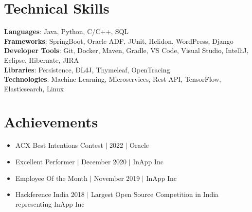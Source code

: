 \documentclass[letterpaper,11pt]{article}
\newcommand{\resumeItem}[1]{
  \item\small{
    {#1 \vspace{-2pt}}
  }
}
\newcommand{\resumeItemListStart}{\begin{itemize}}
\newcommand{\resumeItemListEnd}{\end{itemize}\vspace{-5pt}}
\begin{document}
\section{Technical Skills}
\begin{itemize}[leftmargin=0.15in, label={}]
	\small{\item{
		\textbf{Languages}{: Java, Python, C/C++, SQL} \\
		\textbf{Frameworks}{: SpringBoot, Oracle ADF, JUnit, Helidon, WordPress, Django} \\
		\textbf{Developer Tools}{: Git, Docker, Maven, Gradle, VS Code, Visual Studio, IntelliJ, Eclipse, Hibernate, JIRA} \\
		\textbf{Libraries}{: Persistence, DL4J, Thymeleaf, OpenTracing} \\
		\textbf{Technologies}{: Machine Learning, Microservices, Rest API, TensorFlow, Elasticsearch, Linux }
	}}
\end{itemize}

\section{Achievements}
\begin{itemize}[leftmargin=0.15in, label={}]
	\resumeItemListStart
	\resumeItem{ACX Best Intentions Contest  $\vert$ 2022 $\vert$ Oracle}
	\resumeItem{Excellent Performer $\vert$ December 2020 $\vert$ InApp Inc}
	\resumeItem{Employee Of the Month $\vert$ November 2019 $\vert$ InApp Inc}
	\resumeItem{Hackference India 2018 $\vert$ Largest Open Source
	Competition in India representing InApp Inc}
	\resumeItemListEnd
\end{itemize}
\end{document}

